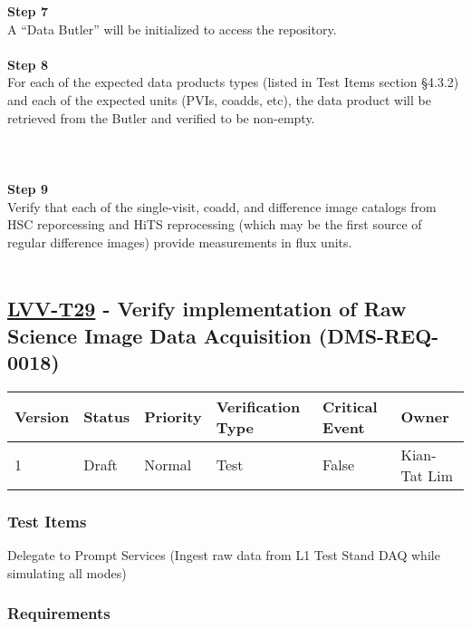 \textbf{Step 7}\\
A ``Data Butler'' will be initialized to access the repository.\\
~\\
\textbf{Step 8}\\
For each of the expected data products types (listed in Test Items
section §4.3.2) and each of the expected units (PVIs, coadds, etc), the
data product will be retrieved from the Butler and verified to be
non-empty.\\
~\\
~\\
~\\
\textbf{Step 9}\\
Verify that each of the single-visit, coadd, and difference image
catalogs from HSC reporcessing and HiTS reprocessing (which may be the
first source of regular difference images) provide measurements in flux
units.\\
~\\

\hypertarget{lvv-t29---verify-implementation-of-raw-science-image-data-acquisition-dms-req-0018}{%
\subsection{\texorpdfstring{\href{https://jira.lsstcorp.org/secure/Tests.jspa\#/testCase/LVV-T29}{LVV-T29}
- Verify implementation of Raw Science Image Data Acquisition
(DMS-REQ-0018)}{LVV-T29 - Verify implementation of Raw Science Image Data Acquisition (DMS-REQ-0018)}}\label{lvv-t29---verify-implementation-of-raw-science-image-data-acquisition-dms-req-0018}}

\begin{longtable}[]{@{}llllll@{}}
\toprule
Version & Status & Priority & Verification Type & Critical Event &
Owner\tabularnewline
\midrule
\endhead
1 & Draft & Normal & Test & False & Kian-Tat Lim\tabularnewline
\bottomrule
\end{longtable}

\hypertarget{test-items-5}{%
\subsubsection{Test Items}\label{test-items-5}}

Delegate to Prompt Services (Ingest raw data from L1 Test Stand DAQ
while simulating all modes)

\hypertarget{requirements-6}{%
\subsubsection{Requirements}\label{requirements-6}}

